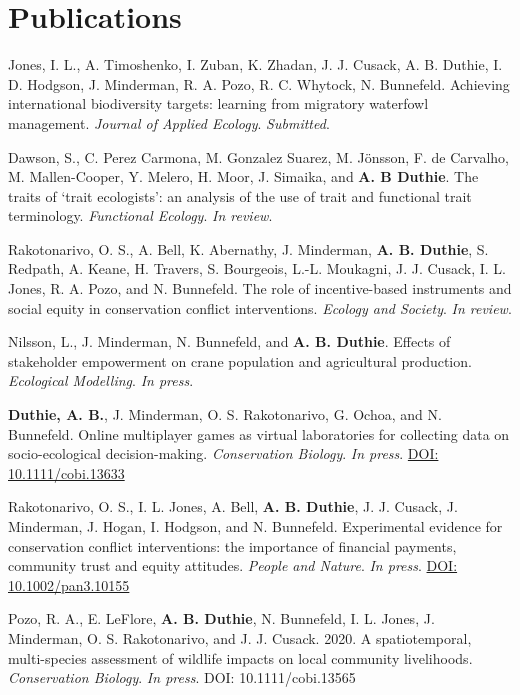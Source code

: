 \documentclass[letterpaper]{article}
\begin{document}
\section*{Publications}
\begin{etaremune}
\item Jones, I. L., A. Timoshenko, I. Zuban, K. Zhadan, J. J. Cusack, A. B. Duthie, I. D. Hodgson, J. Minderman, R. A. Pozo, R. C. Whytock, N. Bunnefeld. Achieving international biodiversity targets: learning from migratory waterfowl management. {\it Journal of Applied Ecology}. {\it Submitted}.
\item Dawson, S., C. Perez Carmona, M. Gonzalez Suarez, M. J\"{o}nsson, F. de Carvalho, M. Mallen-Cooper, Y. Melero, H. Moor, J. Simaika, and {\bf A. B Duthie}. The traits of `trait ecologists': an analysis of the use of trait and functional trait terminology. {\it Functional Ecology}. {\it In review}.
\item Rakotonarivo, O. S., A. Bell, K. Abernathy, J. Minderman, {\bf A. B. Duthie}, S. Redpath, A. Keane, H. Travers, S. Bourgeois, L.-L. Moukagni, J. J. Cusack, I. L. Jones, R. A. Pozo, and N. Bunnefeld. The role of incentive-based instruments and social equity in conservation conflict interventions. {\it Ecology and Society}. {\it In review}.
\item Nilsson, L., J. Minderman, N. Bunnefeld, and {\bf A. B. Duthie}. Effects of stakeholder empowerment on crane population and agricultural production. {\it Ecological Modelling}. {\it In press}.
\item {\bf Duthie, A. B.}, J. Minderman, O. S. Rakotonarivo, G. Ochoa, and N. Bunnefeld. Online multiplayer games as virtual laboratories for collecting data on socio-ecological decision-making. {\it Conservation Biology}. {\it In press}. \href{https://doi.org/10.1111/cobi.13633}{DOI: 10.1111/cobi.13633}
\item Rakotonarivo, O. S., I. L. Jones, A. Bell, {\bf A. B. Duthie}, J. J. Cusack, J. Minderman, J. Hogan, I. Hodgson, and N. Bunnefeld. Experimental evidence for conservation conflict interventions: the importance of financial payments, community trust and equity attitudes. {\it People and Nature}. {\it In press}. \href{https://doi.org/10.1002/pan3.10155}{DOI: 10.1002/pan3.10155}
\item Pozo, R. A., E. LeFlore, {\bf A. B. Duthie}, N. Bunnefeld, I. L. Jones, J. Minderman, O. S. Rakotonarivo, and J. J. Cusack. 2020. A spatiotemporal, multi-species assessment of wildlife impacts on local community livelihoods. {\it Conservation Biology}. {\it In press}.  {DOI: 10.1111/cobi.13565}

\end{etaremune}
\end{document}
